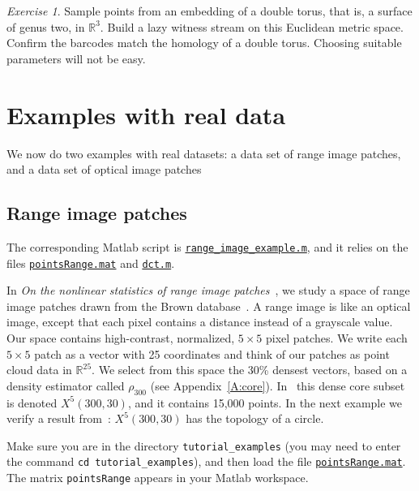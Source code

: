 \documentclass[amscd, amssymb, verbatim]{amsart}[12pt]
\theoremstyle{remark}
\newtheorem{exercise}{Exercise}
\theoremstyle{remark}
\theoremstyle{remark}
\newcommand{\R}{\mathbb{R}}
\begin{document}
\begin{exercise}
Sample points from an embedding of a double torus, that is, a surface of genus two, in $\R^3$. Build a lazy witness stream on this Euclidean metric space. Confirm the barcodes match the homology of a double torus. Choosing suitable parameters will not be easy.
\end{exercise}



\section{Examples with real data}\label{S:real}

We now do two examples with real datasets: a data set of range image patches, and a data set of optical image patches


\subsection{Range image patches}

The corresponding Matlab script is \href{https://github.com/appliedtopology/javaplex/tree/master/src/matlab/for_distribution/tutorial_examples/range_image_example.m}{\texttt{range\_image\_example.m}}, and it relies on the files \href{https://github.com/appliedtopology/javaplex/tree/master/src/matlab/for_distribution/tutorial_examples/pointsRange.mat}{\texttt{pointsRange.mat}} and \href{https://github.com/appliedtopology/javaplex/tree/master/src/matlab/for_distribution/tutorial_examples/dct.m}{\texttt{dct.m}}. 

In {\em On the nonlinear statistics of range image patches}~\citep{Range}, we study a space of range image patches drawn from the Brown database~\citep{Mumford}. A range image is like an optical image, except that each pixel contains a distance instead of a grayscale value. Our space contains high-contrast, normalized, $5 \times5$ pixel patches. We write each $5\times5$ patch as a vector with 25 coordinates and think of our patches as point cloud data in $\R^{25}$. We select from this space the 30\% densest vectors, based on a density estimator called $\rho_{300}$ (see Appendix~\ref{A:core}). In~\citet{Range} this dense core subset is denoted $X^5(300,30)$, and it contains 15,000 points. In the next example we verify a result from~\citet{Range}: $X^5(300,30)$ has the topology of a circle. 

Make sure you are in the directory \texttt{tutorial\_examples} (you may need to enter the command \texttt{cd tutorial\_examples}), and then load the file \href{https://github.com/appliedtopology/javaplex/tree/master/src/matlab/for_distribution/tutorial_examples/pointsRange.mat}{\texttt{pointsRange.mat}}. The matrix \texttt{pointsRange} appears in your Matlab workspace.
\end{document}
